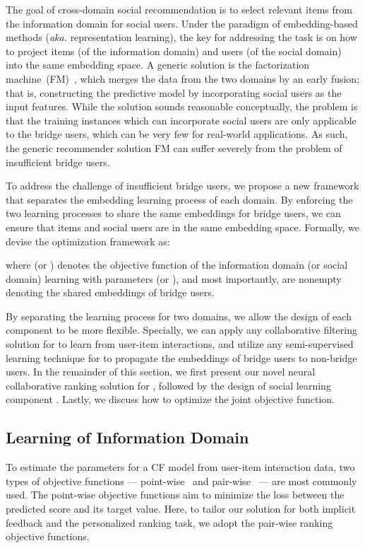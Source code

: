 \documentclass[sigconf]{acmart}
\newcommand{\aka}{\emph{aka. }}
\begin{document}
The goal of cross-domain social recommendation is to select relevant items from the information domain for social users. Under the paradigm of embedding-based methods (\aka representation learning), the key for addressing the task is on how to project items (of the information domain) and users (of the social domain) into the same embedding space.
A generic solution is the factorization machine~(FM)~\cite{DBLP:conf/uai/RendleFGS09,DBLP:journals/tist/Rendle12}, which merges the data from the two domains by an early fusion; that is, constructing the predictive model by incorporating social users as the input features.
While the solution sounds reasonable conceptually, the problem is that the training instances which can incorporate social users are only applicable to the bridge users, which can be very few for real-world applications. As such, the generic recommender solution FM can suffer severely from the problem of insufficient bridge users.

To address the challenge of insufficient bridge users, we propose a new framework that separates the embedding learning process of each domain.
By enforcing the two learning processes to share the same embeddings for bridge users, we can ensure that items and social users are in the same embedding space.
Formally, we devise the optimization framework as:

where  (or ) denotes the objective function of the information domain (or social domain) learning with parameters  (or ), and most importantly,  are nonempty denoting the shared embeddings of bridge users.

By separating the learning process for two domains, we allow the design of each component to be more flexible. Specially, we can apply any collaborative filtering solution for  to learn from user-item interactions, and utilize any semi-supervised learning technique for  to propagate the embeddings of bridge users to non-bridge users.
In the remainder of this section, we first present our novel neural collaborative ranking solution for , followed by the design of social learning component . Lastly, we discuss how to optimize the joint objective function.








\subsection{Learning of Information Domain}
\label{ss:learning_information}
To estimate the parameters for a CF model from user-item interaction data, two types of objective functions --- point-wise~\cite{iCD,heneural} and pair-wise~\cite{DBLP:conf/uai/RendleFGS09,chen2017acf,RankALS} --- are most commonly used.
The point-wise objective functions aim to minimize the loss between the predicted score and its target value.
Here, to tailor our solution for both implicit feedback and the personalized ranking task, we adopt the pair-wise ranking objective functions.
\end{document}
